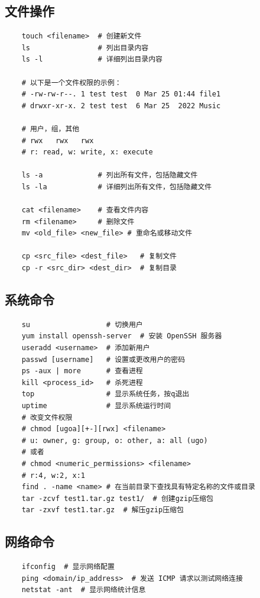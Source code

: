 \documentclass[12pt, a4paper, oneside]{ctexbook}
\numberwithin{figure}{section}
\begin{document}
\subsection{文件操作}

\begin{verbatim}
    touch <filename>  # 创建新文件
    ls                # 列出目录内容
    ls -l             # 详细列出目录内容

    # 以下是一个文件权限的示例：
    # -rw-rw-r--. 1 test test  0 Mar 25 01:44 file1
    # drwxr-xr-x. 2 test test  6 Mar 25  2022 Music

    # 用户，组，其他
    # rwx   rwx   rwx
    # r: read, w: write, x: execute

    ls -a             # 列出所有文件，包括隐藏文件
    ls -la            # 详细列出所有文件，包括隐藏文件

    cat <filename>    # 查看文件内容
    rm <filename>     # 删除文件
    mv <old_file> <new_file> # 重命名或移动文件

    cp <src_file> <dest_file>   # 复制文件
    cp -r <src_dir> <dest_dir>  # 复制目录
\end{verbatim}

\subsection{系统命令}

\begin{verbatim}
    su                  # 切换用户
    yum install openssh-server  # 安装 OpenSSH 服务器
    useradd <username>  # 添加新用户
    passwd [username]   # 设置或更改用户的密码
    ps -aux | more      # 查看进程
    kill <process_id>   # 杀死进程
    top                 # 显示系统任务，按q退出
    uptime              # 显示系统运行时间
    # 改变文件权限
    # chmod [ugoa][+-][rwx] <filename>
    # u: owner, g: group, o: other, a: all (ugo)
    # 或者
    # chmod <numeric_permissions> <filename>
    # r:4, w:2, x:1
    find . -name <name> # 在当前目录下查找具有特定名称的文件或目录
    tar -zcvf test1.tar.gz test1/  # 创建gzip压缩包
    tar -zxvf test1.tar.gz  # 解压gzip压缩包
\end{verbatim}

\subsection{网络命令}

\begin{verbatim}
    ifconfig  # 显示网络配置
    ping <domain/ip_address>  # 发送 ICMP 请求以测试网络连接
    netstat -ant  # 显示网络统计信息
\end{verbatim}
\end{document}

